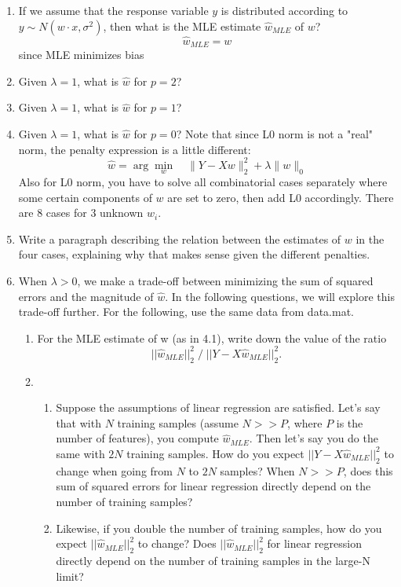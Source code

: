 \begin{enumerate}
\item If we assume that the response variable $y$ is distributed according to $y \sim N( w \cdot x, \sigma^2)$, then what is the MLE estimate $\hat{w}_{MLE}$ of $w$?
\[
\hat{w}_{MLE} = w
\]
since MLE minimizes bias
\item Given $\lambda = 1$, what is $\hat{w}$ for $p=2$? 
\item Given $\lambda = 1$, what is $\hat{w}$ for $p=1$? 
\item Given $\lambda = 1$, what is $\hat{w}$ for $p=0$? Note that since L0 norm is not a "real" norm, the penalty expression is a little different:\\
$$\hat{w} = \arg \min_w  \quad \|Y - Xw\|_2^2 + \lambda \|w\|_0$$
Also for L0 norm, you have to solve all combinatorial cases separately where some certain components of $w$ are set to zero, then add L0 accordingly. There are 8 cases for $3$ unknown $w_i$.

\item Write a paragraph describing the relation between the estimates of
$w$ in the four cases, explaining why that makes sense given the
different penalties.

\item When $\lambda > 0$, we make a trade-off between minimizing the sum of squared errors and the magnitude of $\hat{w}$. In the following questions, we will explore this trade-off further. For the following, use the same data from data.mat.
\begin{enumerate}
\item For the MLE estimate of w (as in 4.1), write down the value of the ratio $$||\hat{w}_{MLE}||_2^2  \; / \; ||Y-X\hat{w}_{MLE}||_2^2.$$

\item
\begin{enumerate}
	\item Suppose the assumptions of linear regression are satisfied. Let's say that with $N$ training samples (assume $N >> P$, where $P$ is the number of features), you compute $\hat{w}_{MLE}$. Then let's say you do the same with $2N$ training samples. How do you expect $||Y-X\hat{w}_{MLE}||_2^2$ to change when going from $N$ to $2N$ samples? When $N>>P$, does this sum of squared errors for linear regression directly depend on the number of training samples?

	\item Likewise, if you double the number of training samples, how do you expect $||\hat{w}_{MLE}||_2^2$ to change? Does $||\hat{w}_{MLE}||_2^2$ for linear regression directly depend on the number of training samples in the large-N limit? 


\end{enumerate}
\end{enumerate}
\end{enumerate}
